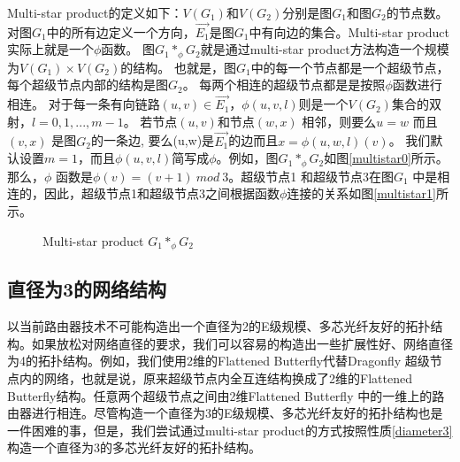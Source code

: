 Multi-star product的定义如下：$V(G_{1})$和$V(G_{2})$分别是图$G_{1}$和图$G_{2}$的节点数。
对图$G_{1}$中的所有边定义一个方向，$\vec{E_{1}}$是图$G_{1}$中有向边的集合。Multi-star product实际上就是一个$\phi$函数。
图$G_{1}*_{\phi} G_{2}$就是通过multi-star product方法构造一个规模为$V(G_{1})\times V(G_{2})$的结构。
也就是，图$G_{1}$中的每一个节点都是一个超级节点，每个超级节点内部的结构是图$G_{2}$。
 每两个相连的超级节点都是是按照$\phi$函数进行相连。
 对于每一条有向链路$(u,v)\in \vec{E_{1}}$，$\phi(u,v,l)$则是一个$V(G_{2})$集合的双射，$l=0,1,...,m-1$。
 若节点$(u,v)$和节点$(w,x)$ 相邻，则要么$u=w$ 而且$(v,x)$ 是图$G_{2}$的一条边, 要么(u,w)是$\vec{E_{1}}$的边而且$x=\phi(u,w,l)(v)$。
 我们默认设置$m=1$，而且$\phi(u,v,l)$简写成$\phi$。例如，图$G_{1}*_{\phi} G_{2}$如图\ref{multistar0}所示。
 那么，$\phi$ 函数是$\phi(v)=(v+1)\ mod\ 3$。超级节点1 和超级节点3在图$G_{1}$ 中是相连的，因此，超级节点1和超级节点3之间根据函数$\phi$连接的关系如图\ref{multistar1}所示。

   \begin{figure}[t]
   \begin{minipage}[t]{\textwidth}
   \centering
   \vspace{2em}
  \vspace{-.3cm}
  \caption{Multi-star product $G_{1}*_{\phi} G_{2}$}
  \label{multistar01}
  \end{minipage}

   \end{figure}

 \subsection{直径为3的网络结构}
   以当前路由器技术不可能构造出一个直径为2的E级规模、多芯光纤友好的拓扑结构。如果放松对网络直径的要求，我们可以容易的构造出一些扩展性好、网络直径为4的拓扑结构。例如，我们使用2维的Flattened Butterfly代替Dragonfly 超级节点内的网络，也就是说，原来超级节点内全互连结构换成了2维的Flattened Butterfly结构。任意两个超级节点之间由2维Flattened Butterfly 中的一维上的路由器进行相连。尽管构造一个直径为3的E级规模、多芯光纤友好的拓扑结构也是一件困难的事，但是，我们尝试通过multi-star product的方式按照性质\ref{diameter3}构造一个直径为3的多芯光纤友好的拓扑结构。

